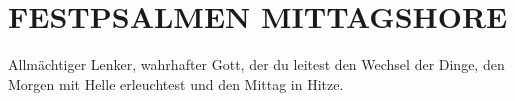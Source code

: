 

\section[]{FESTPSALMEN MITTAGSHORE}


\def\greinitialformat#1{{\fontsize{40}{40}\selectfont #1}}
\gresetfirstlineaboveinitial{\small \textcolor{red}{Hochfest}}{}
\setaboveinitialseparation{0.72mm}

\vspace{1cm}

\def\greinitialformat#1{{\fontsize{40}{40}\selectfont #1}}
\gresetfirstlineaboveinitial{\small \textcolor{red}{Fest}}{}
\setaboveinitialseparation{0.72mm}

\vspace{0.2cm}

\begin{sloppypar}
{\noindent\rm Allmächtiger Lenker, wahrhafter Gott,
der du leitest den Wechsel der Dinge,
den Morgen mit Helle erleuchtest
und den Mittag in Hitze.}
\end{sloppypar}






